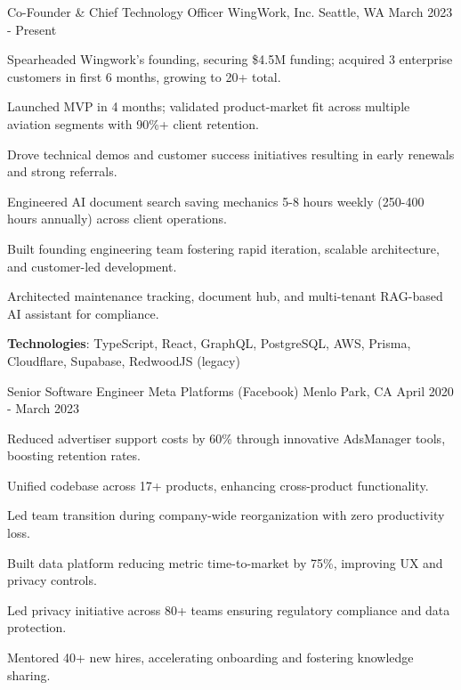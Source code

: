 \begin{cventries}
  \cventry
    {Co-Founder \& Chief Technology Officer}
    {WingWork, Inc.}
    {Seattle, WA}
    {March 2023 - Present}
    {
      \begin{cvitems}
        \item {Spearheaded Wingwork's founding, securing \$4.5M funding; acquired 3 enterprise customers in first 6 months, growing to 20+ total.}
        \item {Launched MVP in 4 months; validated product-market fit across multiple aviation segments with 90\%+ client retention.}
        \item {Drove technical demos and customer success initiatives resulting in early renewals and strong referrals.}
        \item {Engineered AI document search saving mechanics 5-8 hours weekly (250-400 hours annually) across client operations.}
        \item {Built founding engineering team fostering rapid iteration, scalable architecture, and customer-led development.}
        \item {Architected maintenance tracking, document hub, and multi-tenant RAG-based AI assistant for compliance.}
        \item {\textbf{Technologies}: TypeScript, React, GraphQL, PostgreSQL, AWS, Prisma, Cloudflare, Supabase, RedwoodJS (legacy)}
      \end{cvitems}
    }
    {}
    {}
  \cventry
    {Senior Software Engineer}
    {Meta Platforms (Facebook)}
    {Menlo Park, CA}
    {April 2020 - March 2023}
    {
      \begin{cvitems}
        \item {Reduced advertiser support costs by 60\% through innovative AdsManager tools, boosting retention rates.}
        \item {Unified codebase across 17+ products, enhancing cross-product functionality.}
        \item {Led team transition during company-wide reorganization with zero productivity loss.}
        \item {Built data platform reducing metric time-to-market by 75\%, improving UX and privacy controls.}
        \item {Led privacy initiative across 80+ teams ensuring regulatory compliance and data protection.}
        \item {Mentored 40+ new hires, accelerating onboarding and fostering knowledge sharing.}

\end{cvitems}}
\end{cventries}
